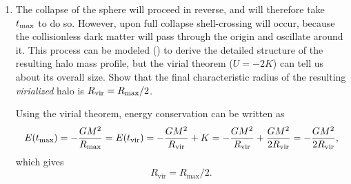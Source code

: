\begin{enumerate}
\begin{enumerate}
\item The collapse of the sphere will proceed in reverse, and will
therefore take $t_{\rm max}$ to do so. However, upon full collapse
shell-crossing will occur, because the collisionless dark matter will
pass through the origin and oscillate around it. This process can be
modeled (\citealt{bertschinger85a, lithwick11a}) to derive the detailed
structure of the resulting halo mass profile, but the virial theorem
($U=-2K$) can tell us about its overall size. Show that the final
characteristic radius of the resulting {\it virialized} halo is
$R_{\rm vir} = R_{\rm max} / 2$.

\begin{answer}
Using the virial theorem, energy conservation
can be written as
\begin{equation}
E(t_{\rm max}) = -\frac{GM^2}{R_\text{max}} = E(t_{\rm vir}) =
-\frac{GM^2}{R_\text{vir}} + K = -\frac{GM^2}{R_\text{vir}} +
\frac{GM^2}{2R_\text{vir}} = -\frac{GM^2}{2R_\text{vir}},
\end{equation}
which gives
\begin{equation}
R_\text{vir}=R_\text{max}/2.
\end{equation}
\end{answer}


\end{enumerate}
\end{enumerate}
